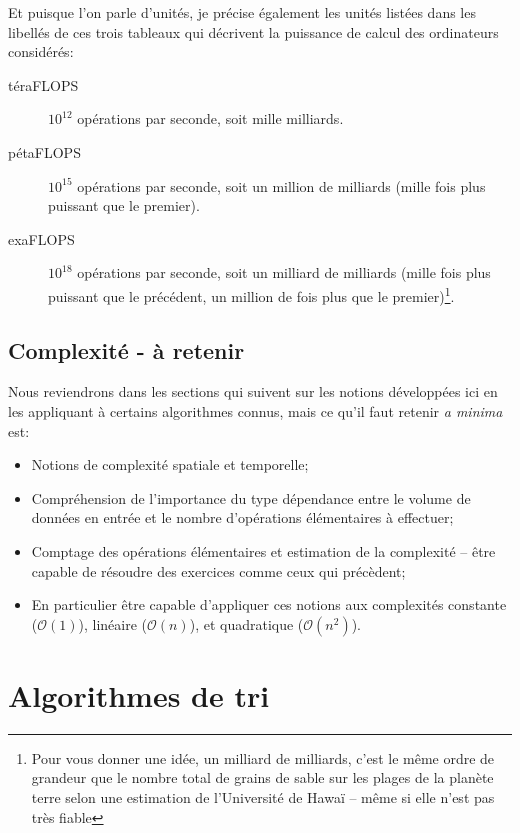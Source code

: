 \documentclass[12pt]{article}
\begin{document}
	Et puisque l'on parle d'unités, je précise également les unités listées dans les libellés de ces trois tableaux qui décrivent la puissance de calcul des ordinateurs considérés:
	\begin{description}
		\item[téraFLOPS] $10^{12}$ opérations par seconde, soit mille milliards.
		\item[pétaFLOPS] $10^{15}$ opérations par seconde, soit un million de milliards (mille fois plus puissant que le premier).
		\item[exaFLOPS] $10^{18}$ opérations par seconde, soit un milliard de milliards (mille fois plus puissant que le précédent, un million de fois plus que le premier)\footnote{Pour vous donner une idée, un milliard de milliards, c'est le même ordre de grandeur que le nombre total de grains de sable sur les plages de la planète terre selon une estimation de l'Université de Hawaï -- même si elle n'est pas très fiable}.
	\end{description}
	
	\subsection{Complexité - à retenir}
	\begin{MonRet}
		Nous reviendrons dans les sections qui suivent sur les notions développées ici en les appliquant à certains algorithmes connus, mais ce qu'il faut retenir \textit{a minima} est:
		\begin{itemize}
			\item Notions de complexité spatiale et temporelle;
			\item Compréhension de l'importance du type dépendance entre le volume de données en entrée et le nombre d'opérations élémentaires à effectuer;
			\item Comptage des opérations élémentaires et estimation de la complexité -- être capable de résoudre des exercices comme ceux qui précèdent;
			\item En particulier être capable d'appliquer ces notions aux complexités constante ($\mathcal{O}(1)$), linéaire ($\mathcal{O}(n)$), et quadratique (\texttt{$\mathcal{O}(n^2)$}).
		\end{itemize}
	\end{MonRet}

	\pagebreak
	\section{Algorithmes de tri}
\end{document}
